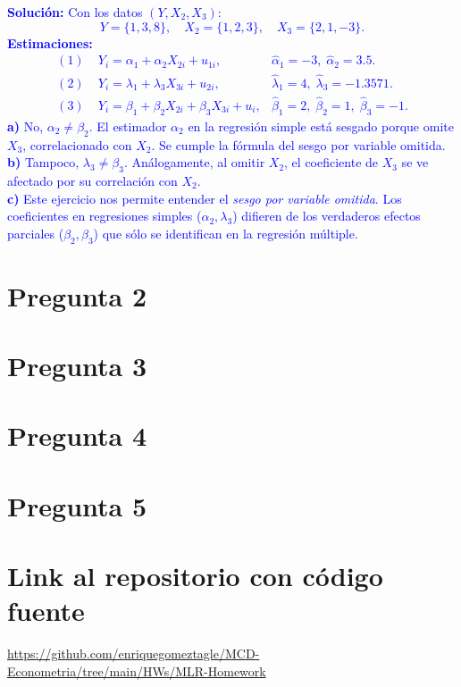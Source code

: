 \documentclass[10pt]{article}
\begin{document}
\textcolor{blue}{
        \textbf{Solución:}  
        Con los datos \((Y, X_2, X_3)\):  
        \[
        Y=\{1,3,8\},\quad X_2=\{1,2,3\},\quad X_3=\{2,1,-3\}.
        \]
        \textbf{Estimaciones:}
        \begin{align*}
        (1)\;& Y_i=\alpha_1+\alpha_2X_{2i}+u_{1i}, & \hat{\alpha}_1=-3,\; \hat{\alpha}_2=3.5. \\
        (2)\;& Y_i=\lambda_1+\lambda_3X_{3i}+u_{2i}, & \hat{\lambda}_1=4,\; \hat{\lambda}_3=-1.3571. \\
        (3)\;& Y_i=\beta_1+\beta_2X_{2i}+\beta_3X_{3i}+u_i, & \hat{\beta}_1=2,\; \hat{\beta}_2=1,\; \hat{\beta}_3=-1.
        \end{align*}
        \textbf{a)} No, \(\alpha_2 \neq \beta_2\). El estimador \(\alpha_2\) en la regresión simple está sesgado porque omite \(X_3\), correlacionado con \(X_2\). Se cumple la fórmula del sesgo por variable omitida.\\
        \textbf{b)} Tampoco, \(\lambda_3 \neq \beta_3\). Análogamente, al omitir \(X_2\), el coeficiente de \(X_3\) se ve afectado por su correlación con \(X_2\).\\
        \textbf{c)} Este ejercicio nos permite entender el \textit{sesgo por variable omitida}. Los coeficientes en regresiones simples (\(\alpha_2,\lambda_3\)) difieren de los verdaderos efectos parciales (\(\beta_2,\beta_3\)) que sólo se identifican en la regresión múltiple.
    }
\section{Pregunta 2}
\section{Pregunta 3}
\section{Pregunta 4}
\section{Pregunta 5}
\section{Link al repositorio con código fuente}
\url{https://github.com/enriquegomeztagle/MCD-Econometria/tree/main/HWs/MLR-Homework}
\end{document}
